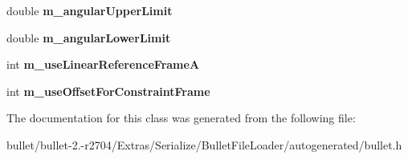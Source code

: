 \begin{DoxyCompactItemize}
\item 
\hypertarget{class_bullet_1_1bt_slider_constraint_double_data_a1e76c044f3a1128faf3b08877f4d7545}{double {\bfseries m\+\_\+angular\+Upper\+Limit}}\label{class_bullet_1_1bt_slider_constraint_double_data_a1e76c044f3a1128faf3b08877f4d7545}

\item 
\hypertarget{class_bullet_1_1bt_slider_constraint_double_data_aa379de364bd6fc1a46af17845a534483}{double {\bfseries m\+\_\+angular\+Lower\+Limit}}\label{class_bullet_1_1bt_slider_constraint_double_data_aa379de364bd6fc1a46af17845a534483}

\item 
\hypertarget{class_bullet_1_1bt_slider_constraint_double_data_a19576cd86d3ad6967475af90a3ac6732}{int {\bfseries m\+\_\+use\+Linear\+Reference\+Frame\+A}}\label{class_bullet_1_1bt_slider_constraint_double_data_a19576cd86d3ad6967475af90a3ac6732}

\item 
\hypertarget{class_bullet_1_1bt_slider_constraint_double_data_a01752cac396a529fced5b2ee8b6c2359}{int {\bfseries m\+\_\+use\+Offset\+For\+Constraint\+Frame}}\label{class_bullet_1_1bt_slider_constraint_double_data_a01752cac396a529fced5b2ee8b6c2359}

\end{DoxyCompactItemize}


The documentation for this class was generated from the following file\+:\begin{DoxyCompactItemize}
\item 
bullet/bullet-\/2.-\/r2704/\+Extras/\+Serialize/\+Bullet\+File\+Loader/autogenerated/bullet.\+h\end{DoxyCompactItemize}

